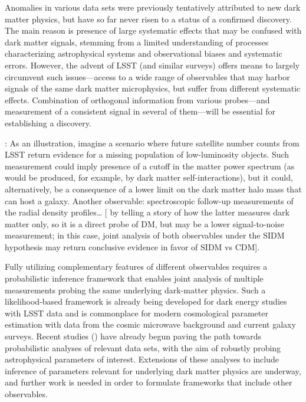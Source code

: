 \documentclass[modern,linenumbers]{aastex62}
\begin{document}
Anomalies in various data sets were previously tentatively attributed to new dark matter physics, but have so far never risen to a status of a confirmed discovery. 
The main reason is presence of large systematic effects that may be confused with dark matter signals, stemming from a limited understanding of processes characterizing astrophysical systems and observational biases and systematic errors. 
However, the advent of LSST (and similar surveys) offers means to largely circumvent such issues---access to a wide range of observables that may harbor signals of the same dark matter microphysics, but suffer from different systematic effects. 
Combination of orthogonal information from various probes---and measurement of a consistent signal in several of them---will be essential for establishing a discovery. 

: As an illustration, imagine a scenario where future satellite number counts from LSST return evidence for a missing population of low-luminosity objects. 
Such measurement could imply presence of a cutoff in the matter power spectrum (as would be produced, for example, by dark matter self-interactions), but it could, alternatively, be a consequence of a lower limit on the dark matter halo mass that can host a galaxy. 
Another observable: spectroscopic follow-up measurements of the radial density profiles… [ by telling a story of how the latter measures dark matter only, so it is a direct probe of DM, but may be a lower signal-to-noise measurement; in this case, joint analysis of both observables under the SIDM hypothesis may return conclusive evidence in favor of SIDM vs CDM].

Fully utilizing complementary features of different observables requires a probabilistic inference framework that enables joint analysis of multiple measurements probing the same underlying dark-matter physics. 
Such a likelihood-based framework is already being developed for dark energy studies with LSST data and is commonplace for modern cosmological parameter estimation with data from the cosmic microwave background and current galaxy surveys. 
Recent studies () have already begun paving the path towards probabilistic analyses of relevant data sets, with the aim of robustly probing astrophysical parameters of interest. 
Extensions of these analyses to include inference of parameters relevant for underlying dark matter physics are underway, and further work is needed in order to formulate frameworks that include other observables. 
\end{document}
